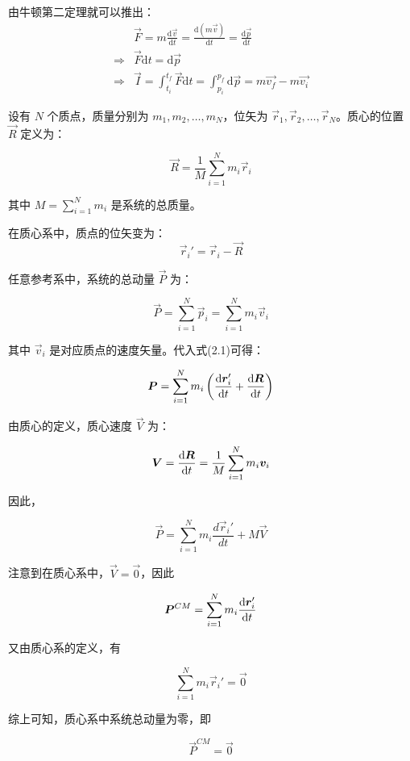 \begin{prove}

    由牛顿第二定理就可以推出：
    \begin{equation}
        \begin{aligned}
     &\vec{F}=m\frac{\mathrm{d}\vec{v}}{\mathrm{d}t}=\frac{\mathrm{d}(m\vec{v})}{\mathrm{d}t}=\frac{\mathrm{d}\vec{p}}{\mathrm{d}t}\\
    \Longrightarrow &\vec{F}\mathrm{d}t=\mathrm{d}\vec{p}\\
    \Longrightarrow &\vec{I}=\int_{t_{i}}^{t_{f}}\vec{F}\mathrm{d}t= \int_{p_{i}}^{p_{f}}\mathrm{d}\vec{p}=m\vec{v_{f}}-m\vec{v_{i}} 
        \end{aligned}
        \nonumber
    \end{equation}
\end{prove}
\begin{prove}
	设有 \( N \) 个质点，质量分别为 \( m_1, m_2, \ldots, m_N \)，位矢为 \( \vec{r}_1, \vec{r}_2, \ldots, \vec{r}_N \)。质心的位置 \(\vec{R}\) 定义为：
	
	\[
	\vec{R} = \frac{1}{M} \sum_{i=1}^{N} m_i \vec{r}_i
	\]
	
	其中 \( \displaystyle M = \sum_{i=1}^{N} m_i \) 是系统的总质量。
	
	在质心系中，质点的位矢变为：
	\begin{equation}
		\vec{r}_i' = \vec{r}_i - \vec{R}
	\end{equation}
	
	任意参考系中，系统的总动量 \(\vec{P}\) 为：
	
	\[
	\vec{P} = \sum_{i=1}^{N} \vec{p}_i = \sum_{i=1}^{N} m_i \vec{v}_i
	\]
	
	其中 \(\vec{v}_i\) 是对应质点的速度矢量。代入式(2.1)可得：
	
	\[
	\vec{P} = \sum_{i=1}^{N} m_i \left(\frac{\dif\vec{r}_i'}{\dif t} + \frac{\dif\vec{R}}{\dif t}\right)
	\]
	
	由质心的定义，质心速度 \(\vec{V}\) 为：
	
	\[
	\vec{V} = \frac{\dif \vec{R}}{\dif t} = \frac{1}{M} \sum_{i=1}^{N} m_i \vec{v}_i
	\]
	
	因此，
	
	\[
	\vec{P} = \sum_{i=1}^{N} m_i \frac{d\vec{r}_i'}{dt} + M \vec{V}
	\]
	
	注意到在质心系中，\(\vec{V} = \vec{0}\)，因此
	
	\[
	\vec{P}^{CM} = \sum_{i=1}^{N} m_i \frac{\dif\vec{r}_i'}{\dif t}
	\]
	
	又由质心系的定义，有
	
	\[
	\sum_{i=1}^{N} m_i \vec{r}_i' = \vec{0}
	\]
	
	综上可知，质心系中系统总动量为零，即
	
	\[
	\vec{P}^{CM} = \vec{0}
	\]
\end{prove}
